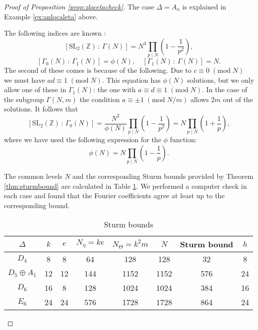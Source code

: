 \documentclass[11pt,a4paper]{amsart}
\theoremstyle{definition}
\newcommand{\SZ}{\mathbb{Z}}                    %
\begin{document}
\begin{proof}[{Proof of Proposition \ref{prop:zlocetacheck}}]
The case $\Delta=A_n$ is explained in Example \ref{ex:anlocaleta} above. 

The following indices are known \cite[Section 1.2]{diamond2005first}:
\[ [\mathrm{SL}_2(\SZ) \, : \, \Gamma(N) ]= N^3 \prod_{p \mid N}\left(1-\frac{1}{p^2} \right), \]
\[ [\Gamma_0(N) \, : \, \Gamma_1(N) ]= \phi(N), \quad [\Gamma_1(N) \, : \, \Gamma(N) ]= N. \]
The second of these comes is because of the following. Due to $c \equiv 0 \;( \mathrm{mod}\;N)$ we must have $ad\equiv 1 \;( \mathrm{mod}\;N)$. This equation has $\phi(N)$ solutions, but we only allow one of these in $\Gamma_1(N)$: the one with $a\equiv d\equiv 1 \;(\mathrm{mod}\;N)$. In the case of the subgroup $\Gamma(N,m)$ the condition $a \equiv \pm 1 \;( \mathrm{mod}\;N/m)$ allows $2m$ out of the solutions.
It follows that
\[  [\mathrm{SL}_2(\SZ) \, : \, \Gamma_0(N) ]=\frac{N^2}{\phi(N)}\prod_{p \mid N}\left(1-\frac{1}{p^2} \right)=N\prod_{p \mid  N}\left(1+\frac{1}{p} \right), \]
where we have used the following expression for the $\phi$ function:
\[ \phi(N)=N \prod_{p \mid  N}\left(1-\frac{1}{p} \right). \]



The common levels $N$ and the corresponding Sturm bounds provided by Theorem \ref{thm:sturmbound} are calculated in Table \ref{table:sturm}. We performed a computer check in each case and found that the Fourier coefficients agree at least up to the corresponding bound.
\begin{table}
	\begin{tabular}{ |c|c|c|c|c|c|c|c| }
		\hline
		$\Delta$ & $k$ & $e$ & $N_{\eta}=ke$ & $N_{\Theta}=k^2m$ & $N$ & Sturm bound & $h$\\
		\hline
		$D_4$ & 8 & 8 & 64 & 128 & 128 & 32 & 8 \\
$D_5\oplus A_1$ & 12 & 12 & 144 & 1152 & 1152 & 576 & 24 \\
		$D_6$ & 16 & 8 & 128 & 1024 & 1024 & 384 & 16 \\
		$E_6$ & 24 & 24 & 576 & 1728 & 1728 & 864 & 24 \\
		\hline
	\end{tabular}
	\vspace{0.2in}
	\caption{Sturm bounds}
	\label{table:sturm}
\end{table}


\end{proof}
\end{document}
